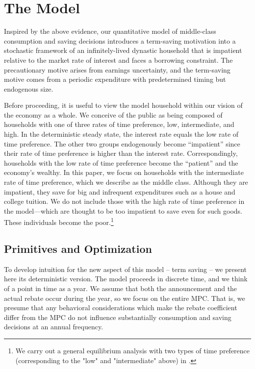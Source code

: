 \documentclass[fleqccn,12pt]{article}
\begin{document}
\section{The Model\label{DeterministicModel}}
\setcounter{theorem}{0}

Inspired by the above evidence, our quantitative model of middle-class consumption and saving decisions introduces a term-saving motivation into a stochastic framework of an infinitely-lived dynastic household that is impatient relative to the market rate of interest and faces a borrowing constraint.  The precautionary motive arises from earnings uncertainty, and the term-saving motive comes from a periodic expenditure with predetermined timing but endogenous size. 

Before proceeding, it is useful to view the model household within our vision of the economy as a whole. We conceive of the public as being composed of households with one of three rates of time preference, low, intermediate, and high. In the deterministic steady state, the interest rate equals the low rate of time preference. The other two groups endogenously become ``impatient'' since their rate of time preference is higher than the interest rate. Correspondingly, households with the low rate of time preference become the ``patient'' and the economy's wealthy. In this paper, we focus on households with the intermediate rate of time preference, which we describe as the middle class. Although they are impatient, they save for big and infrequent expenditures such as a house and college tuition. We do not include those with the high rate of time preference in the model---which are thought to be too impatient to save even for such goods. These individuals become the poor.\footnote{We carry out a general equilibrium analysis with two types of time preference (corresponding to the "low" and "intermediate" above) in \cite{jme2009CampbellHercowitz}.}

\subsection{Primitives and Optimization\label{Basic Model}}

To develop intuition for the new aspect of this model -- term saving -- we present here its deterministic version.  The model proceeds in discrete time, and we think of a point in time as a year. We assume that both the announcement and the actual rebate occur during the year, so we focus on the entire MPC. That is, we presume that any behavioral considerations which make the rebate coefficient differ from the MPC do not influence substantially consumption and saving decisions at an annual frequency. 
\end{document}
